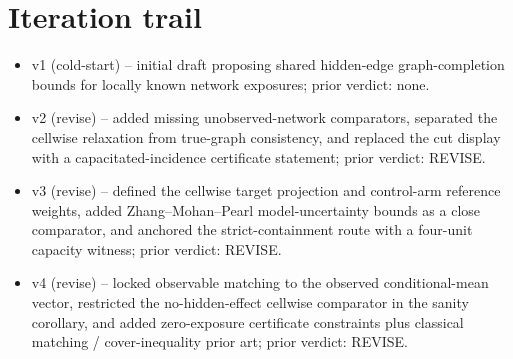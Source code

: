 \documentclass[11pt]{article}
\theoremstyle{definition}
\theoremstyle{plain}
\theoremstyle{remark}
\begin{document}
\section{Iteration trail}
\begin{itemize}[leftmargin=*]
\item v1 (cold-start) -- initial draft proposing shared hidden-edge graph-completion bounds for locally known network exposures; prior verdict: none.
\item v2 (revise) -- added missing unobserved-network comparators, separated the cellwise relaxation from true-graph consistency, and replaced the cut display with a capacitated-incidence certificate statement; prior verdict: REVISE.
\item v3 (revise) -- defined the cellwise target projection and control-arm reference weights, added Zhang--Mohan--Pearl model-uncertainty bounds as a close comparator, and anchored the strict-containment route with a four-unit capacity witness; prior verdict: REVISE.
\item v4 (revise) -- locked observable matching to the observed conditional-mean vector, restricted the no-hidden-effect cellwise comparator in the sanity corollary, and added zero-exposure certificate constraints plus classical matching / cover-inequality prior art; prior verdict: REVISE.
\end{itemize}
\end{document}
